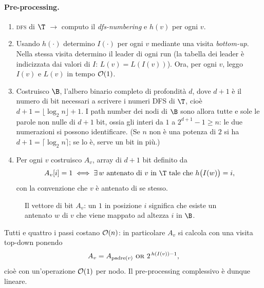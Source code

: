 \paragraph{Pre-processing.}
\begin{enumerate}
  \item \textsc{dfs} di $\T$ $\longrightarrow$ computo il \emph{dfs-numbering} e $h(v)$
        per ogni $v$.

  \item Usando $h(\cdot)$ determino $I(\cdot)$ per ogni $v$ mediante una visita
        \emph{bottom-up}. Nella stessa visita determino il leader di ogni run (la
        tabella dei leader è indicizzata dai valori di $I$: $L(v)=L(I(v))$). Ora, per
        ogni $v$, leggo $I(v)$ e $L(v)$ in tempo $\mathcal{O}(1)$.

  \item Costruisco $\B$, l'albero binario completo di profondità $d$, dove $d+1$ è il
        numero di bit necessari a scrivere i numeri DFS di $\T$, cioè
        $d+1=\lfloor\log_2 n\rfloor+1$. I path number dei nodi di $\B$ sono allora
        tutte e sole le parole non nulle di $d+1$ bit, ossia gli interi da $1$ a
        $2^{d+1}-1\ge n$: le due numerazioni si possono identificare. (Se $n$ non è una
        potenza di $2$ si ha $d+1=\lceil \log_2 n\rceil$; se lo è, serve un bit in più.)

  \item Per ogni $v$ costruisco $A_v$, array di $d+1$ bit definito da
        \[
          A_v[i] = 1 \iff \exists\, w \text{ antenato di } v \text{ in } \T
          \text{ tale che } h\bigl(I(w)\bigr) = i ,
        \]
        con la convenzione che $v$ è antenato di se stesso.
\end{enumerate}

\begin{figure}[H]
  \centering
  
  \caption{Il vettore di bit $A_v$: un $1$ in posizione $i$ significa che esiste un
    antenato $w$ di $v$ che viene mappato ad altezza $i$ in $\B$.}
  \label{fig:av-bitvector}
\end{figure}

\begin{osservazione}
  Tutti e quattro i passi costano $\mathcal{O}(n)$: in particolare $A_v$ si calcola con una
  visita top-down ponendo
  \[
    A_v = A_{\mathrm{padre}(v)} \ \textsc{or}\ 2^{\,h(I(v))-1},
  \]
  cioè con un'operazione $\mathcal{O}(1)$ per nodo. Il pre-processing complessivo è dunque
  lineare.
\end{osservazione}

